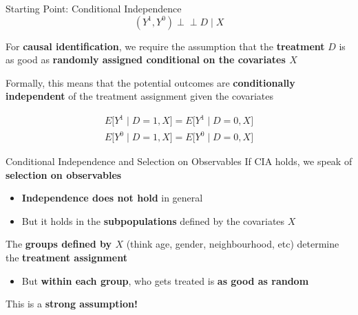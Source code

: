 \documentclass[
  ignorenonframetext,
  aspectratio=169, handout]{beamer}
\providecommand{\tightlist}{%
  \setlength{\itemsep}{0pt}\setlength{\parskip}{0pt}}
\newcommand{\brf}[1]{\textcolor{brickred}{\textbf{#1}}}
\newcommand{\ind}{\mathrel{\perp\!\!\!\perp}}
\begin{document}
\begin{frame}{Starting Point: Conditional Independence}
\protect\hypertarget{starting-point-conditional-independence}{}
\begin{equation*}
(Y^1,Y^0) \ind D\mid X
\end{equation*}

\vfill

For \brf{causal identification}, we require the assumption that the
\brf{treatment} \(D\) is as good as
\brf{randomly assigned conditional on the covariates $X$} \vfill

Formally, this means that the potential outcomes are
\brf{conditionally independent} of the treatment assignment given the
covariates

\begin{align*}
   E\big[Y^1\mid D=1,X\big]=E\big[Y^1\mid D=0,X\big]
   \\
   E\big[Y^0\mid D=1,X\big]=E\big[Y^0\mid D=0,X\big]
\end{align*}
\end{frame}

\begin{frame}{Conditional Independence and Selection on Observables}
\protect\hypertarget{conditional-independence-and-selection-on-observables}{}
If CIA holds, we speak of \brf{selection on observables}

\begin{itemize}
\tightlist
\item
  \textbf{Independence does not hold} in general
\item
  But it holds in the \textbf{subpopulations} defined by the covariates
  \(X\)
\end{itemize}

\vfill

The \brf{groups defined by $X$} (think age, gender, neighbourhood, etc)
determine the \brf{treatment assignment}

\begin{itemize}
\tightlist
\item
  But \textbf{within each group}, who gets treated is \textbf{as good as
  random}
\end{itemize}

\vfill

This is a \textbf{strong assumption!}
\end{frame}
\end{document}
